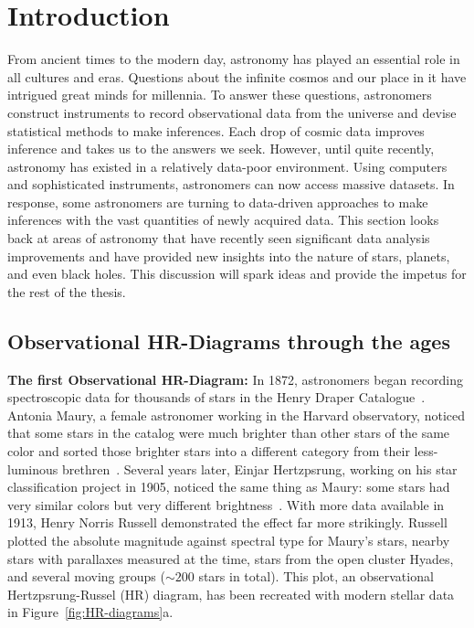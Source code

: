  \chapter{Introduction}
\label{cp.intro}

From ancient times to the modern day, astronomy has played an essential role in all cultures and eras.
Questions about the infinite cosmos and our place in it have intrigued great minds for millennia.
To answer these questions, astronomers construct instruments to record observational data from the universe and devise statistical methods to make inferences.
Each drop of cosmic data improves inference and takes us to the answers we seek.
However, until quite recently, astronomy has existed in a relatively data-poor environment. 
Using computers and sophisticated instruments, astronomers can now access massive datasets.
In response, some astronomers are turning to data-driven approaches to make inferences with the vast quantities of newly acquired data.
This section looks back at areas of astronomy that have recently seen significant data analysis improvements and have provided new insights into the nature of stars, planets, and even black holes.
This discussion will spark ideas and provide the impetus for the rest of the thesis.


\section{Observational HR-Diagrams through the ages}

\textbf{The first Observational HR-Diagram:}
In 1872, astronomers began recording spectroscopic data for thousands of stars in the Henry Draper Catalogue~\cite{Cannon:1918:AnHar}.
Antonia Maury, a female astronomer working in the Harvard observatory, noticed that some stars in the catalog were much brighter than other stars of the same color and sorted those brighter stars into a different category from their less-luminous brethren~\cite{1914_HR_data}. 
Several years later, Einjar Hertzpsrung, working on his star classification project in 1905, noticed the same thing as Maury: some stars had very similar colors but very different brightness~\cite{1914_HR_data}.
With more data available in 1913, Henry Norris Russell demonstrated the effect far more strikingly. 
Russell plotted the absolute magnitude against spectral type for Maury's stars, nearby stars with parallaxes measured at the time, stars from the open cluster Hyades, and several moving groups ($\sim200$ stars in total). 
This plot, an observational Hertzpsrung-Russel (HR) diagram, has been recreated with modern stellar data in Figure~\ref{fig:HR-diagrams}a.

